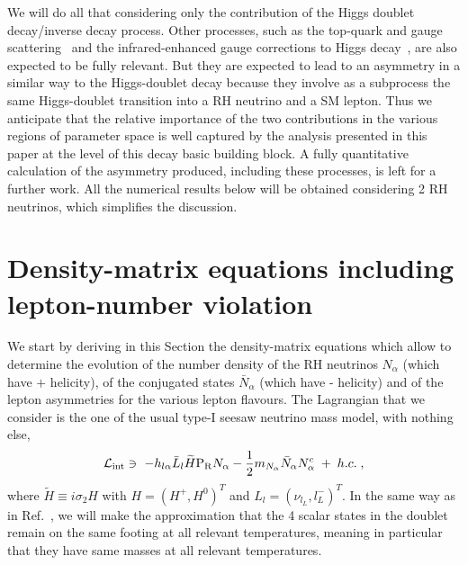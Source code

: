 \documentclass[prd,twocolumn,superscriptaddress,preprintnumbers,nofootinbib,
noshowpacs,groupedaddress]{revtex4-1} %
\begin{document}
We will do all that considering only the contribution of the Higgs doublet decay/inverse decay process. Other processes, such as the top-quark and gauge scattering~\cite{Besak:2012qm,Ghiglieri:2016xye,Ghiglieri:2017gjz} and the infrared-enhanced gauge corrections to Higgs decay~\cite{Anisimov:2010gy}, are also expected to be fully relevant. But they are expected to lead to an asymmetry in a similar  way to the Higgs-doublet decay 
because they involve as a subprocess the same Higgs-doublet transition into a RH neutrino and a SM lepton.
Thus we anticipate that the relative importance of the two contributions in the various regions of parameter space is well captured by the analysis presented in this paper at the level of this decay basic building block. A fully quantitative calculation of the asymmetry produced, including these processes, is left for a further work.
All the numerical results below will be obtained considering 2 RH neutrinos, which simplifies the discussion.


\section{Density-matrix equations including lepton-number violation}

We start by deriving in this Section the density-matrix equations which allow to determine the evolution of the number density of the RH neutrinos $N_\alpha$ (which have $+$ helicity), of the conjugated states $\bar{N}_\alpha$ (which have - helicity) and of the lepton asymmetries for the various lepton flavours.  
The Lagrangian that we consider is the one of the usual type-I seesaw neutrino mass model, with nothing else,
\begin{equation}
\mathcal L_{\rm int}  \owns \ - h_{l \alpha} \bar{L}_l \widetilde{H} \mathrm{P_R} N_\alpha -\frac{1}{2} m_{N_\alpha} \bar{N}_\alpha N^c_\alpha\;+\; h.c. \;,
\end{equation}
where $\widetilde H\equiv i \sigma_2 H$ with $H=(H^+,H^0)^T$ and $L_l=(\nu_{l_L},l^-_L)^T$. In the same way as in Ref.~\cite{Hambye:2016sby}, we will make the approximation that the 4 scalar states in the doublet remain on the same footing at all relevant temperatures,  meaning in particular that they have same masses at all relevant temperatures.
\end{document}
